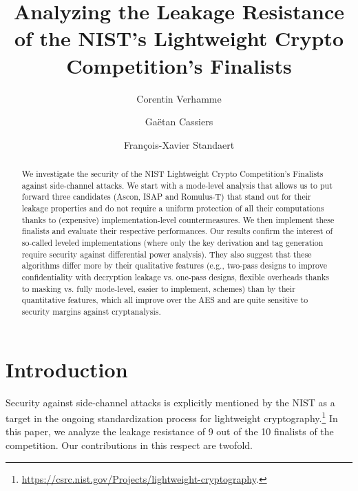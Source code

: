 \documentclass{llncs}
\begin{document}
 

\title{Analyzing the Leakage Resistance of the NIST's Lightweight Crypto Competition's Finalists}
\author{Corentin Verhamme \and Ga\"{e}tan Cassiers \and Fran\c{c}ois-Xavier Standaert}
\maketitle

\begin{abstract}
We investigate the security of the NIST Lightweight Crypto Competition's Finalists
against side-channel attacks. We start with a mode-level analysis that allows
us to put forward three candidates (Ascon, ISAP and Romulus-T) 
that stand out for their leakage properties
and do not require a uniform protection of all their computations thanks
to (expensive) implementation-level countermeasures.
We then implement these finalists and evaluate
their respective performances. Our results confirm the interest of so-called
leveled implementations (where only the key derivation and tag generation
require security against differential power analysis). They also
suggest that these algorithms differ more by their qualitative features 
(e.g., two-pass designs to improve confidentiality with decryption
leakage vs. one-pass designs, flexible overheads thanks to masking vs.
fully mode-level, easier to implement, schemes) than by their quantitative 
features, which all improve over the AES and are quite sensitive to
security margins against cryptanalysis.
\end{abstract}


\section{Introduction}
Security against side-channel attacks is explicitly mentioned by the NIST as a target in the
ongoing standardization process for lightweight cryptography.\footnote{\url{https://csrc.nist.gov/Projects/lightweight-cryptography}.} 
In this paper, we analyze the leakage resistance of 9 out of the 10 finalists of the 
competition. Our contributions in this respect are twofold.

\medskip
\end{document}

